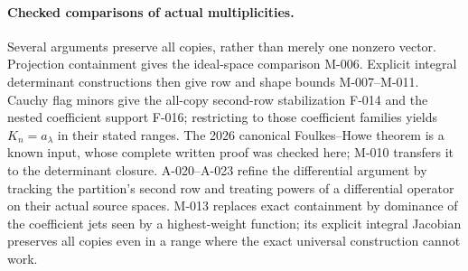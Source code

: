\paragraph{Checked comparisons of actual multiplicities.}
Several arguments preserve all copies, rather than merely one
nonzero vector. Projection containment gives the ideal-space
comparison M-006. Explicit integral determinant constructions
then give row and shape bounds M-007--M-011. Cauchy flag minors
give the all-copy second-row stabilization F-014 and the nested
coefficient support F-016; restricting to those coefficient
families yields \(K_n=a_\lambda\) in their stated ranges.
The 2026 canonical Foulkes--Howe theorem is a known input, whose
complete written proof was checked here; M-010 transfers it to
the determinant closure. A-020--A-023 refine the differential
argument by tracking the partition's second row and treating powers
of a differential operator on their actual source spaces.
M-013 replaces exact containment by dominance of the coefficient
jets seen by a highest-weight function; its explicit integral
Jacobian preserves all copies even in a range where the exact
universal construction cannot work.


